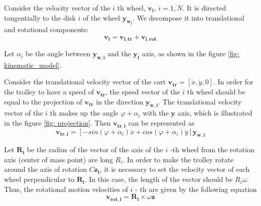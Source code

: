 \documentclass[oneside,final,14pt]{extreport}
\newcommand{\bs}{\boldsymbol}
\begin{document}
\begin{figure} [H]
\end{figure}


Consider the velocity vector of the $ i $ th wheel, $ \bs{v_{i}} $, $ i = \overline{1, N} $. It is directed tangentially to the disk $ i $ of the wheel $ \bs{y_{w_i}} $. We decompose it into translational and rotational components:
\begin{equation}
\bs{v_{i}}
=
\bs{v_{i, tr}}
+
\bs{v_{i, rot}}
\end{equation}

Let $ \alpha_{i} $ be the angle between $ \bs{y_{w, i}} $ and the $ \bs{y_{l}} $ axis, as shown in the figure \ref{fig: kinematic_model}.




Consider the translational velocity vector of the cart $ \bs{v_{tr}} = [\dot{x}, \dot{y}, 0] $. In order for the trolley to have a speed of $ \bs{v_{tr}} $, the speed vector of the $ i $ th wheel should be equal to the projection of $ \bs{v_{tr}} $ in the direction $ \bs{y_{w, i}} $. The translational velocity vector of the $ i $ th makes up the angle $ \varphi + \alpha_{i} $ with the $ \bs{y} $ axis, which is illustrated in the figure \ref{fig: projection}. Then $ \bs{v_{tr, i}} $ can be represented as
\begin{equation}
\label{eq: v_rt_i_global}
\bs{v_{tr, i}}
=
[
-sin (\varphi + \alpha_{i})
\dot{x}
+
cos (\varphi + \alpha_{i})
\dot{y}
]
\bs{y_{w, i}}
\end{equation}



\begin{figure} [H]
\end{figure}

Let $ \bs{R_{i}} $ be the radius of the vector of the axis of the $ i $ -th wheel from the rotation axis (center of mass point) are long $ R_{i} $. In order to make the trolley rotate around the axis of rotation $ C \bs{z_{l}} $, it is necessary to set the velocity vector of each wheel perpendicular to $ \bs{R_{i}} $. In this case, the length of the vector should be $ R_{i} \omega $.
Thus, the rotational motion velocities of $ i $ - th are given by the following equation
\begin{equation}
\bs{v_{rot, i}}
=
\bs{R_{i}}
\times
\omega
\bs{z}
\end{equation}
\end{document}
